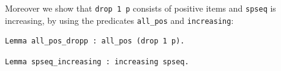 \documentclass[11pt, a4paper]{article}
\begin{document}
%
Moreover we show that \lstinline!drop 1 p! consists of positive items and \lstinline!spseq! is increasing, by using the predicates \lstinline!all_pos! and \lstinline!increasing!:
\begin{lstlisting}
Lemma all_pos_dropp : all_pos (drop 1 p).
\end{lstlisting}
\begin{lstlisting}
Lemma spseq_increasing : increasing spseq.
\end{lstlisting}
\end{document}
